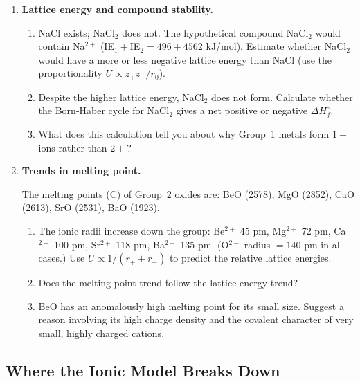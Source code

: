 \documentclass[12pt, a4paper]{book}
\begin{document}
\begin{problembox}
\begin{enumerate}[label=\textbf{\arabic*.}]
  \item \textbf{Lattice energy and compound stability.}

    \begin{enumerate}[label=(\alph*)]
      \item NaCl exists; NaCl$_2$ does not.
            The hypothetical compound NaCl$_2$ would contain
            Na$^{2+}$ (IE$_1+$IE$_2 = 496+4562$ kJ/mol).
            Estimate whether NaCl$_2$ would have a more
            or less negative lattice energy than NaCl
            (use the proportionality $U \propto z_+z_-/r_0$).
      \item Despite the higher lattice energy, NaCl$_2$ does not form.
            Calculate whether the Born-Haber cycle for
            NaCl$_2$ gives a net positive or negative
            $\Delta H_f^\circ$.
      \item What does this calculation tell you about why
            Group~1 metals form $1+$ ions rather than $2+$?
    \end{enumerate}

  \item \textbf{Trends in melting point.}

    The melting points (\textdegree C) of Group~2 oxides are:
    BeO (2578), MgO (2852), CaO (2613), SrO (2531), BaO (1923).
    \begin{enumerate}[label=(\alph*)]
      \item The ionic radii increase down the group:
            Be$^{2+}$ 45 pm, Mg$^{2+}$ 72 pm,
            Ca$^{2+}$ 100 pm, Sr$^{2+}$ 118 pm, Ba$^{2+}$ 135 pm.
            (O$^{2-}$ radius $= 140$ pm in all cases.)
            Use $U \propto 1/(r_+ + r_-)$ to predict the
            relative lattice energies.
      \item Does the melting point trend follow the
            lattice energy trend?
      \item BeO has an anomalously high melting point
            for its small size.
            Suggest a reason involving its high charge density
            and the covalent character of very small, highly
            charged cations.
    \end{enumerate}
\end{enumerate}
\end{problembox}

\subsection*{Where the Ionic Model Breaks Down}
\end{document}
